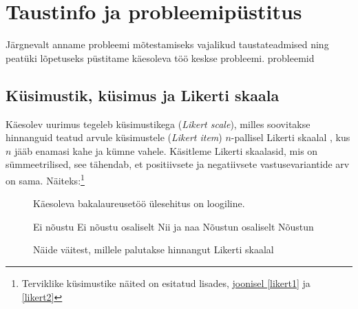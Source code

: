 \documentclass[a4paper,12pt,oneside]{article}
\numberwithin{equation}{section}
\theoremstyle{definition}
\begin{document}
\pagebreak



\section{Taustinfo ja probleemipüstitus}

Järgnevalt anname probleemi mõtestamiseks vajalikud taustateadmised ning pea\-tüki lõpetuseks püstitame käesoleva töö keskse probleemi. {\color{red} probleemid}

\subsection{Küsimustik, küsimus ja Likerti skaala}

Käesolev uurimus tegeleb k\"usimustikega (\textit{Likert scale}),  milles soovitakse hinnan\-guid teatud arvule küsimustele (\textit{Likert item}) $n$-pallisel Likerti skaalal \cite{Edmondson}, kus $n$ jääb enamasi kahe ja kümne vahele.  Käsitleme Likerti skaalasid, mis on sümmeetrilised, see tähendab, et positiivsete ja negatiivsete vastusevariantide arv on sama. Näiteks:\footnote{Terviklike k\"usimustike näited on esitatud lisades, \hyperref[likert1]{joonisel \ref*{likert1}} ja \hyperref[likert2]{\ref*{likert2}}}

\vspace{10pt}

\begin{figure}[H]


\colorbox{background_example}{\parbox{\textwidth}{

\vspace{1mm}

Käesoleva bakalaureusetöö \"ulesehitus on loogiline.

\vspace{5pt}

\begin{Form}
\def\DefaultWidthofChoiceMenu{12pt}%


\small{
	\CheckBox[bordercolor = gray,name=optionE]{\mbox{}} Ei nõustu 
	\CheckBox[bordercolor = gray,name=optionD]{\mbox{}} Ei nõustu osaliselt
	\CheckBox[bordercolor = gray,name=optionC]{\mbox{}} Nii ja naa
	\CheckBox[bordercolor = gray,name=optionC]{\mbox{}}  Nõustun osaliselt
	\CheckBox[checked,bordercolor = gray,name=optionC]{\mbox{}} Nõustun
}


\end{Form}}}
\caption{Näide väitest, millele palutakse hinnangut Likerti skaalal}
\label{likert_question}
\end{figure}
\end{document}
